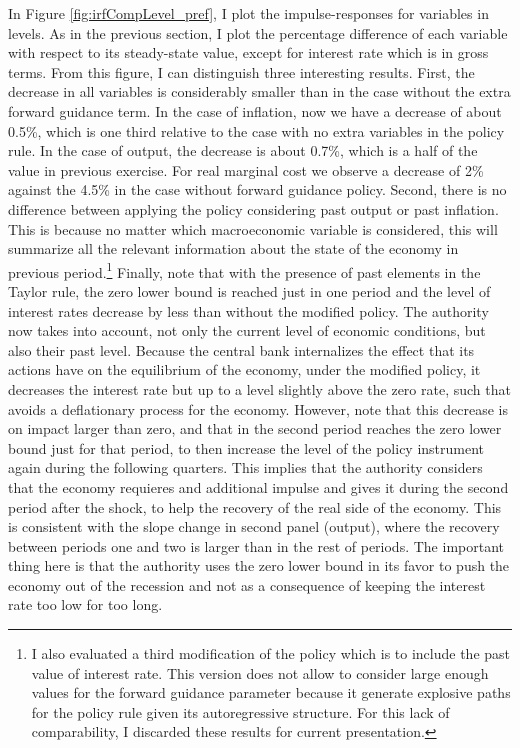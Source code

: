 \documentclass[12pt]{article}
\numberwithin{equation}{section}
\begin{document}
In Figure \ref{fig:irfCompLevel_pref}, I plot the impulse-responses for variables in levels. As in the previous section, I plot the percentage difference of each variable with respect to its steady-state value, except for interest rate which is in gross terms. From this figure, I can distinguish three interesting results. First, the decrease in all variables is considerably smaller than in the case without the extra forward guidance term. In the case of inflation, now we have a decrease of about 0.5\%, which is one third relative to the case with no extra variables in the policy rule. In the case of output, the decrease is about 0.7\%, which is a half of the value in previous exercise. For real marginal cost we observe a decrease of 2\% against the 4.5\% in the case without forward guidance policy. Second, there is no difference between applying the policy considering past output or past inflation. This is because no matter which macroeconomic variable is considered, this will summarize all the relevant information about the state of the economy in previous period.\footnote{I also evaluated a third modification of the policy which is to include the past value of interest rate. This version does not allow to consider large enough values for the forward guidance parameter because it generate explosive paths for the policy rule given its autoregressive structure. For this lack of comparability, I discarded these results for current presentation.} Finally, note that with the presence of past elements in the Taylor rule, the zero lower bound is reached just in one period and the level of interest rates decrease by less than without the modified policy. The authority now takes into account, not only the current level of economic conditions, but also their past level. Because the central bank internalizes the effect that its actions have on the equilibrium of the economy, under the modified policy, it decreases the interest rate but up to a level slightly above the zero rate, such that avoids a deflationary process for the economy. However, note that this decrease is on impact larger than zero, and that in the second period reaches the zero lower bound just for that period, to then increase the level of the policy instrument again during the following quarters. This implies that the authority considers that the economy requieres and additional impulse and gives it during the second period after the shock, to help the recovery of the real side of the economy. This is consistent with the slope change in second panel (output), where the recovery between periods one and two is larger than in the rest of periods. The important thing here is that the authority uses the zero lower bound in its favor to push the economy out of the recession and not as a consequence of keeping the interest rate too low for too long.
\end{document}
